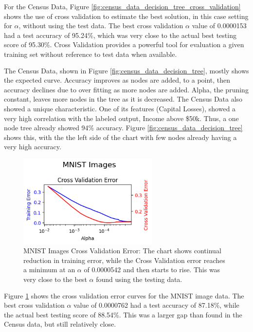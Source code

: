 \documentclass[letterpaper]{article} %
\begin{document}
For the Census Data, Figure \ref{fig:census_data_decision_tree_cross_validation} shows the use of cross validation to estimate the best solution, in this case setting for $\alpha$, without using the test data.   The best cross validation $\alpha$ value of 0.0000153 had a test accuracy of 95.24\%, which was very close to the actual best testing score of 95.30\%.  Cross Validation provides a powerful tool for evaluation a given training set without reference to test data when available.

The Census Data, shown in Figure \ref{fig:census_data_decision_tree},  mostly shows the expected curve.  Accuracy improves as nodes are added, to a point, then accuracy declines due to over fitting as more nodes are added.  Alpha, the pruning constant, leaves more nodes in the tree as it is decreased.  The Census Data also showed a unique characteristic.  One of its features (Capital Losses), showed a very high correlation with the labeled output, Income above \$50k.  Thus, a one node tree already showed 94\% accuracy.  Figure \ref{fig:census_data_decision_tree} shows this, with the the left side of the chart with few nodes already having a very high accuracy.  


\begin{figure}[h]
\centering
\includegraphics[width=2.75in]{figures/MNIST_Images_decision_tree_cross_validation.png}
\caption{MNIST Images Cross Validation Error:  The chart shows continual reduction in training error, while the Cross Validation error reaches a minimum at an $\alpha$ of 0.0000542 and then starts to rise.  This was very close to the best $\alpha$ found using the testing data. }
\label{fig:MNIST_Images_decision_tree_cross_validation}
\end{figure}

Figure \ref{fig:MNIST_Images_decision_tree_cross_validation}  shows the cross validation error curves for the MNIST image data.  The best cross validation $\alpha$ value of 0.0000762 had a test accuracy of 87.18\%,  while the actual best testing score of 88.54\%.  This was a larger gap than found in the Census data, but still relatively close.
\end{document}
